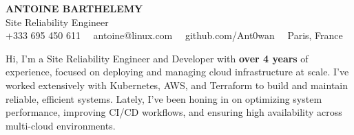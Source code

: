 \documentclass[10pt]{developercv}
\begin{document}
\begin{center}
    {\huge\textbf{\MakeUppercase{Antoine Barthelemy}}} \\
    \vspace{3pt}
    {\LARGE Site Reliability Engineer} \\
    \vspace{3pt}
+333 695 450 611 \ \ antoine@linux.com \ \ github.com/Ant0wan \ \ Paris, France
\end{center}

\hspace{0pt}
\begin{minipage}[t]{1.00\textwidth}
\vspace{-6pt}
{Hi, I’m a Site Reliability Engineer and Developer with \textbf{over 4 years} of experience, focused on deploying and managing cloud infrastructure at scale. I’ve worked extensively with Kubernetes, AWS, and Terraform to build and maintain reliable, efficient systems. Lately, I’ve been honing in on optimizing system performance, improving CI/CD workflows, and ensuring high availability across multi-cloud environments.}
\end{minipage}
\vspace{3pt}
\hfill

\end{document}
